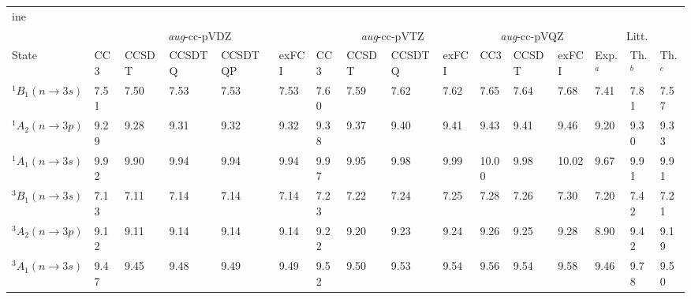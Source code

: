 \newcommand{\TDDFT}{TD-DFT}
\newcommand{\CASSCF}{CASSCF}
\newcommand{\CASPT}{CASPT2}
\newcommand{\ADC}[1]{ADC(#1)}
\newcommand{\CC}[1]{CC#1}
\newcommand{\CCSD}{CCSD}
\newcommand{\EOMCCSD}{EOM-CCSD}
\newcommand{\CCSDT}{CCSDT}
\newcommand{\CCSDTQ}{CCSDTQ}
\newcommand{\CCSDTQP}{CCSDTQP}
\newcommand{\CI}{CI}
\newcommand{\sCI}{sCI}
\newcommand{\exCI}{exFCI}
\newcommand{\FCI}{FCI}

\newcommand{\AVDZ}{\emph{aug}-cc-pVDZ}
\newcommand{\AVTZ}{\emph{aug}-cc-pVTZ}
\newcommand{\DAVTZ}{d-\emph{aug}-cc-pVTZ}
\newcommand{\AVQZ}{\emph{aug}-cc-pVQZ}
\newcommand{\DAVQZ}{d-\emph{aug}-cc-pVQZ}
\newcommand{\TAVQZ}{t-\emph{aug}-cc-pVQZ}
\newcommand{\AVPZ}{\emph{aug}-cc-pV5Z}
\newcommand{\DAVPZ}{d-\emph{aug}-cc-pV5Z}
\newcommand{\PopleDZ}{6-31+G(d)}

\newcommand{\pis}{\pi^\star}
\newcommand{\Ryd}{\mathrm{R}}

\begin{tabular}{l|p{.6cm}p{1.1cm}p{1.4cm}p{1.7cm}p{.9cm}|p{.6cm}p{1.1cm}p{1.4cm}p{.9cm}|p{.6cm}p{1.1cm}p{.9cm}|p{.7cm}p{.7cm}p{.7cm}}
	ine 
			 \multicolumn{16}{c}{Water}\\
			& \multicolumn{5}{c}{\AVDZ} & \multicolumn{4}{c}{\AVTZ}& \multicolumn{3}{c}{\AVQZ} & \multicolumn{3}{c}{Litt.}\\
	State 	& {\CC{3}} & {\CCSDT} & {\CCSDTQ} & {\CCSDTQP} & {\exCI} & {\CC{3}} & {\CCSDT} & {\CCSDTQ}  & {\exCI}& {\CC{3}} & {\CCSDT}   & {\exCI} & Exp.$^a$ & Th.$^b$ & Th.$^c$\\
	$^1B_1 (n \rightarrow 3s)$ 	&7.51&7.50&7.53&7.53&7.53	&7.60&7.59&7.62&7.62	&7.65	&7.64	&7.68	&7.41 &7.81&7.57\\
	$^1A_2 (n \rightarrow 3p)$ 	&9.29&9.28&9.31&9.32&9.32	&9.38&9.37&9.40&9.41	&9.43	&9.41	&9.46	&9.20 &9.30&9.33\\
	$^1A_1 (n \rightarrow 3s)$ 	&9.92&9.90&9.94&9.94&9.94	&9.97&9.95&9.98&9.99	&10.00	&9.98	&10.02	&9.67 &9.91&9.91\\
	$^3B_1 (n \rightarrow 3s)$ 	&7.13&7.11&7.14&7.14&7.14	&7.23&7.22&7.24&7.25	&7.28	&7.26	&7.30	&7.20 &7.42&7.21\\
	$^3A_2 (n \rightarrow 3p)$ 	&9.12&9.11&9.14&9.14&9.14	&9.22&9.20&9.23&9.24	&9.26	&9.25	&9.28	&8.90 &9.42&9.19\\
	$^3A_1 (n \rightarrow 3s)$ 	&9.47&9.45&9.48&9.49&9.49	&9.52&9.50&9.53&9.54	&9.56	&9.54	&9.58	&9.46 &9.78&9.50\\
\end{tabular}